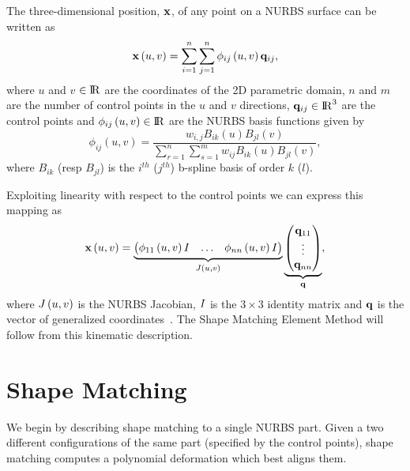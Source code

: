 The three-dimensional position, $\mathbf{x}$, of any point on a NURBS surface can be written as 
\begin{equation}
\label{eqn:nurbs_srf}
\mathbf{x}\left(u,v\right) = \sum_{i=1}^n\sum_{j=1}^n \phi_{ij}\left(u,v\right)\mathbf{q}_{ij},
\end{equation}
where $u$ and $v$ $\in {\rm I\!R}$ are the coordinates of the 2D parametric domain, $n$ and $m$ are the number of control points in the $u$ and $v$ directions, $\mathbf{q}_{ij}\in{\rm I\!R}^3$ are the control points and $\phi_{ij}\left(u,v\right)\in{\rm I\!R}$ are the NURBS
basis functions given by 
\begin{equation*}
    \phi_{ij}\left(u,v\right) = \frac{w_{i,j}B_{ik}(u)B_{jl}(v)}{\sum_{r=1}^{n}\sum_{s=1}^{m} w_{ij} B_{ik}(u)B_{jl}(v)},
\end{equation*} where $B_{ik}$ (resp $B_{jl}$) is the $i^{th}$ ($j^{th}$) b-spline basis of order $k$ ($l$). 

Exploiting linearity with respect to the control points  we can express this mapping as 
\begin{equation}
    \mathbf{x}\left(u,v\right) = \underbrace{\begin{pmatrix} \phi_{11}\left(u,v\right)I & \dots & \phi_{nn}\left(u,v\right)I \end{pmatrix}}_{J\left(u,v\right)}
    \underbrace{\begin{pmatrix} \mathbf{q}_{11} \\ \vdots \\ \mathbf{q}_{nn}\end{pmatrix}}_{\mathbf{q}},
\end{equation} where $J\left(u,v\right)$ is the NURBS Jacobian, $I$ is the $3\times3$ identity matrix and $\mathbf{q}$ is the vector of generalized coordinates~.
The Shape Matching Element Method will follow from this kinematic description.

\section{Shape Matching}
\label{sec:shapematching}

We begin by describing shape matching to a single NURBS part. 
Given a two different configurations of the same part (specified by the control points), shape matching computes a polynomial deformation which best aligns them.

